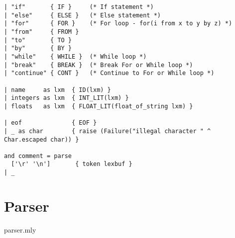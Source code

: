 \begin{lstlisting}
| "if"       { IF }     (* If statement *)
| "else"	 { ELSE }	(* Else statement *)
| "for"      { FOR }    (* For loop - for(i from x to y by z) *)
| "from"     { FROM }
| "to"       { TO }
| "by"       { BY }
| "while"    { WHILE }  (* While loop *)
| "break"    { BREAK }  (* Break For or While loop *)
| "continue" { CONT }   (* Continue to For or While loop *)

| name     as lxm  { ID(lxm) } 
| integers as lxm  { INT_LIT(lxm) }
| floats   as lxm  { FLOAT_LIT(float_of_string lxm) }

| eof              { EOF }
| _ as char        { raise (Failure("illegal character " ^ Char.escaped char)) }

and comment = parse
  ['\r' '\n']       { token lexbuf }
| _                
\end{lstlisting}

\section{Parser}
parser.mly

